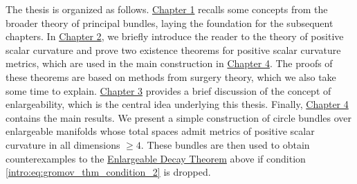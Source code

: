 The thesis is organized as follows. \hyperref[sec:bundles]{Chapter 1} recalls some concepts from the broader theory of principal bundles, laying the foundation for the subsequent chapters. In \hyperref[sec:psc]{Chapter 2}, we briefly introduce the reader to the theory of positive scalar curvature and prove two existence theorems for positive scalar curvature metrics, which are used in the main construction in \hyperref[sec:constr]{Chapter 4}. The proofs of these theorems are based on methods from surgery theory, which we also take some time to explain. \hyperref[sec:enl]{Chapter 3} provides a brief discussion of the concept of enlargeability, which is the central idea underlying this thesis. Finally, \hyperref[sec:constr]{Chapter 4} contains the main results. We present a simple construction of circle bundles over enlargeable manifolds whose total spaces admit metrics of positive scalar curvature in all dimensions $\geq 4$. These bundles are then used to obtain counterexamples to the \hyperref[intro:thm:gromov_thm]{Enlargeable Decay Theorem} above if condition \ref{intro:eq:gromov_thm_condition_2} is dropped.
